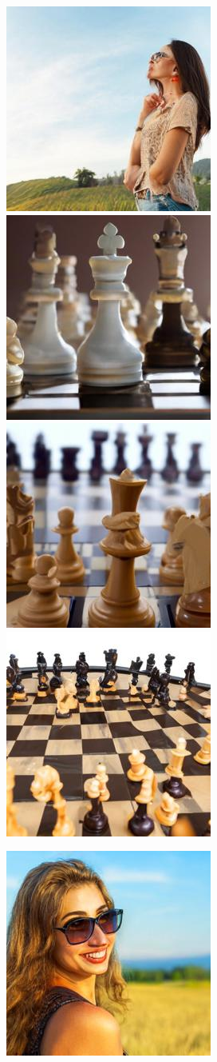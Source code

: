 \documentclass[]{fairmeta}
\begin{document}
\begin{figure}[b!]
\begin{subfigure}[t]{0.495\linewidth}
        \includegraphics[width=0.32\linewidth]{figs/samples/cfg_prompt_72_image_6.jpg}\\
        \includegraphics[width=0.32\linewidth]{figs/samples/cfg_prompt_75_image_0.jpg}\;%
        \includegraphics[width=0.32\linewidth]{figs/samples/cfg_prompt_75_image_3.jpg}\;%
        \includegraphics[width=0.32\linewidth]{figs/samples/cfg_prompt_75_image_9.jpg}
    \end{subfigure}
    \begin{subfigure}[t]{0.495\linewidth}
        \centering
        \includegraphics[width=0.32\linewidth]{figs/samples/adjmat_prompt_72_image_0.jpg}\;%

\end{subfigure}
\end{figure}
\end{document}
